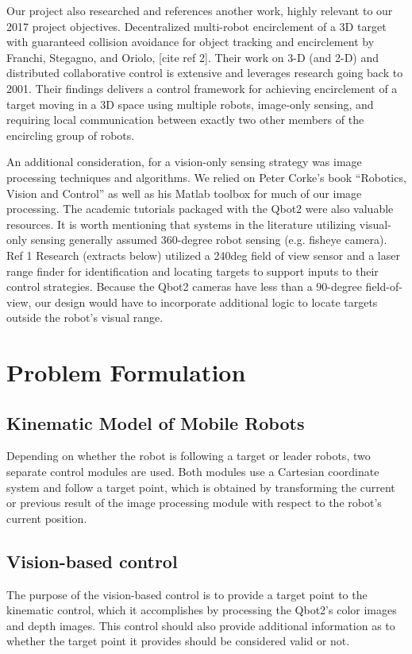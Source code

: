 \documentclass[conference]{IEEEtran}
\begin{document}
Our project also researched and references another work, highly relevant to our 2017 project objectives. Decentralized multi-robot encirclement of a 3D target with guaranteed collision avoidance for object tracking and encirclement by Franchi, Stegagno, and Oriolo, [cite ref 2]. Their work on 3-D (and 2-D) and distributed collaborative control is extensive and leverages research going back to 2001.   Their findings delivers a control framework for achieving encirclement of a target moving in a 3D space using multiple robots, image-only sensing, and requiring local communication between exactly two other members of the encircling group of robots. 

An additional consideration, for a vision-only sensing strategy was image processing techniques and algorithms.  We relied on Peter Corke’s book “Robotics, Vision and Control” as well as his Matlab toolbox for much of our image processing.  The academic tutorials packaged with the Qbot2 were also valuable resources.  It is worth mentioning that systems in the literature utilizing visual-only sensing generally assumed 360-degree robot sensing (e.g. fisheye camera). Ref 1 Research (extracts below) utilized a 240deg field of view sensor and a laser range finder for identification and locating targets to support inputs to their control strategies.  Because the Qbot2 cameras have less than a 90-degree field-of-view, our design would have to incorporate additional logic to locate targets outside the robot’s visual range.

\section{Problem Formulation}


\subsection{Kinematic Model of Mobile Robots}

Depending on whether the robot is following a target or leader robots, two separate control modules are used. Both modules use a Cartesian coordinate system and follow a target point, which is obtained by transforming the current or previous result of the image processing module with respect to the robot’s current position.

\subsection{Vision-based control}
The purpose of the vision-based control is to provide a target point to the kinematic control, which it accomplishes by processing the Qbot2’s color images and depth images. This control should also provide additional information as to whether the target point it provides should be considered valid or not.
\end{document}
